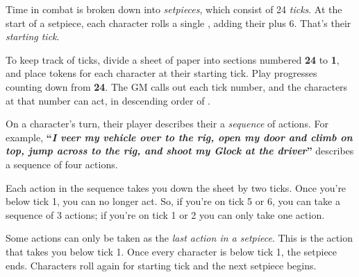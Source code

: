 
Time in combat is broken down into \emph{setpieces}, which consist of 24 \emph{ticks}. At the start of a setpiece, each character rolls a single , adding their  plus 6. That's their \emph{starting tick}.

To keep track of ticks, divide a sheet of paper into sections numbered \textbf{24} to \textbf{1}, and place tokens for each character at their starting tick. Play progresses counting down from \textbf{24}. The GM calls out each tick number, and the characters at that number can act, in descending order of .

On a character's turn, their player describes their a \emph{sequence} of actions. For example, \textbf{``\emph{I veer my vehicle over to the rig, open my door and climb on top, jump across to the rig, and shoot my Glock at the driver}''} describes a sequence of four actions.

Each action in the sequence takes you down the sheet by two ticks. Once you're below tick 1, you can no longer act. So, if you're on tick 5 or 6, you can take a sequence of 3 actions; if you're on tick 1 or 2 you can only take one action.

Some actions can only be taken as the \emph{last action in a setpiece}. This is the action that takes you below tick 1. Once every character is below tick 1, the setpiece ends. Characters roll again for starting tick and the next setpiece begins.

